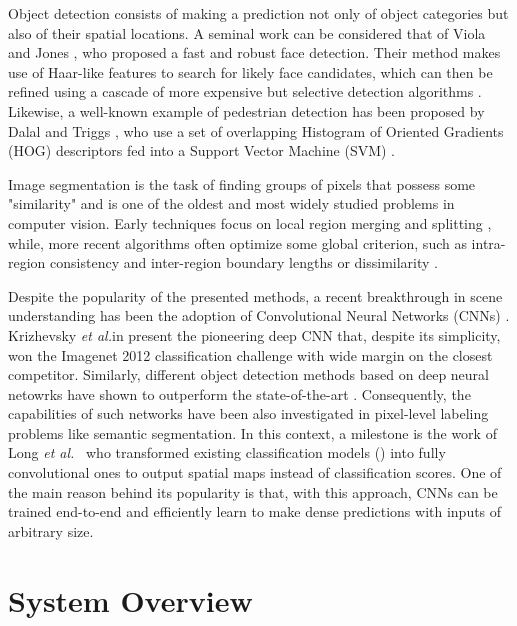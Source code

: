 \documentclass[conference]{IEEEtran}
\newcommand\etal{\emph{et al.}}
\begin{document}
Object detection consists of making a prediction not only of object
categories but also of their spatial locations. A seminal work can be
considered that of Viola and Jones \cite{viola2004ijcv}, who proposed
a fast and robust face detection. Their method makes use of Haar-like
features \cite{papageorgiou1998iccv} to search for likely face
candidates, which can then be refined using a cascade of more
expensive but selective detection algorithms
\cite{freund1997jcss}. Likewise, a well-known example of pedestrian
detection has been proposed by Dalal and Triggs \cite{dalal2005cvpr},
who use a set of overlapping Histogram of Oriented Gradients (HOG)
descriptors fed into a Support Vector Machine (SVM)
\cite{cortes1995support}.

Image segmentation is the task of finding groups of pixels that
possess some "similarity" and is one of the oldest and most widely
studied problems in computer vision.  Early techniques focus on local
region merging and splitting
\cite{ohlander1978picture,brice1970scene}, while, more recent
algorithms often optimize some global criterion, such as intra-region
consistency and inter-region boundary lengths or dissimilarity
\cite{comaniciu2002pami,shi2000pami,felzenszwalb2004ijcv,chan2001ip,osher1988jcp}.

Despite the popularity of the presented methods, a recent breakthrough
in scene understanding has been the adoption of Convolutional Neural
Networks (CNNs) \cite{garcia2017review}. Krizhevsky \etal in
\cite{krizhevsky2012nipsjournal} present the pioneering deep CNN that,
despite its simplicity, won the Imagenet 2012 classification challenge
with wide margin on the closest competitor. Similarly, different
object detection methods based on deep neural netowrks have shown to
outperform the state-of-the-art
\cite{redmon2016cvpr,erhan2014cvpr,liu2016eccv}. Consequently, the
capabilities of such networks have been also investigated in
pixel-level labeling problems like semantic segmentation. In this
context, a milestone is the work of Long \etal~\cite{long2015cvpr} who
transformed existing classification models
(\cite{simonyan2014very,szegedy2015cvpr}) into fully convolutional
ones to output spatial maps instead of classification scores. One of
the main reason behind its popularity is that, with this approach,
CNNs can be trained end-to-end and efficiently learn to make dense
predictions with inputs of arbitrary size.

\section{System Overview}
\end{document}
